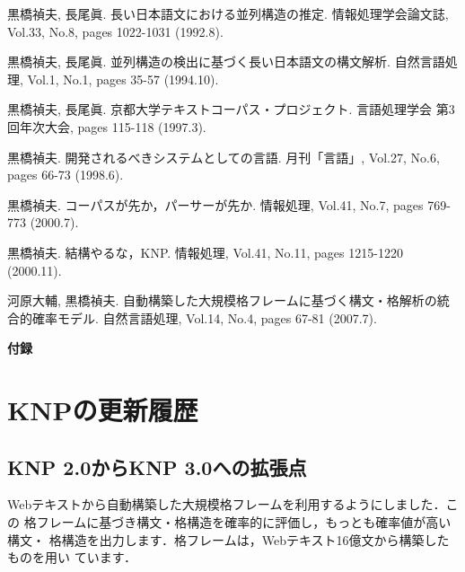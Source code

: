 \documentclass[a4j,11pt,titlepage]{jarticle}
\begin{document}
\begin{thebibliography}{}

黒橋禎夫, 長尾眞.
\newblock 長い日本語文における並列構造の推定.
\newblock 情報処理学会論文誌, Vol.33, No.8, pages 1022-1031 (1992.8).

黒橋禎夫, 長尾眞.
\newblock 並列構造の検出に基づく長い日本語文の構文解析.
\newblock 自然言語処理, Vol.1, No.1, pages 35-57 (1994.10).

黒橋禎夫, 長尾眞.
\newblock 京都大学テキストコーパス・プロジェクト.
\newblock 言語処理学会 第3回年次大会, pages 115-118 (1997.3).

黒橋禎夫.
\newblock 開発されるべきシステムとしての言語.
\newblock 月刊「言語」, Vol.27, No.6, pages 66-73 (1998.6).

黒橋禎夫.
\newblock コーパスが先か，パーサーが先か.
\newblock 情報処理, Vol.41, No.7, pages 769-773 (2000.7).

黒橋禎夫.
\newblock 結構やるな，KNP.
\newblock 情報処理, Vol.41, No.11, pages 1215-1220 (2000.11).

河原大輔, 黒橋禎夫.
\newblock 自動構築した大規模格フレームに基づく構文・格解析の統合的確率モデル.
\newblock 自然言語処理, Vol.14, No.4, pages 67-81 (2007.7).

\end{thebibliography}

\clearpage


\noindent
{\LARGE\bf 付録}

\appendix

\section{KNPの更新履歴}

\subsection{KNP 2.0からKNP 3.0への拡張点}

Webテキストから自動構築した大規模格フレームを利用するようにしました．この
格フレームに基づき構文・格構造を確率的に評価し，もっとも確率値が高い構文・
格構造を出力します．格フレームは，Webテキスト16億文から構築したものを用い
ています．
\end{document}
